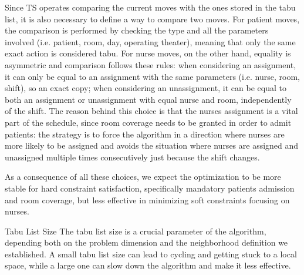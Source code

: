 \begin{section}
\begin{subsection}
     Since TS operates comparing the current moves with the ones stored in the tabu list, it is also necessary to
     define a way to compare two moves. For patient moves, the comparison is performed by checking
     the type and all the parameters involved (i.e. patient, room, day, operating theater),
     meaning that only the same exact action is considered tabu.
     For nurse moves, on the other hand, equality is asymmetric and comparison follows these rules:
     when considering an assignment, it can only be equal to an assignment with the same parameters (i.e. nurse, room, shift),
     so an exact copy;
     when considering an unassignment, it can be equal to both an assignment or unassignment with equal nurse and room,
     independently of the shift.
     The reason behind this choice is that the nurses assignment is a vital part of the schedule,
     since room coverage needs to be granted in order to admit patients:
     the strategy is to force the algorithm in a direction where nurses are more likely to be assigned and avoids the situation
     where nurses are assigned and unassigned multiple times consecutively just because the shift changes.

     As a consequence of all these choices, we expect the optimization to be more stable for hard constraint satisfaction, specifically mandatory patients admission
     and room coverage, but less effective in minimizing soft constraints focusing on nurses.


 \end{subsection}

 \begin{subsection}
     {Tabu List Size}
     The tabu list size is a crucial parameter of the algorithm, depending
     both on the problem dimension and the neighborhood definition we established.
     A small tabu list size can lead to cycling and getting stuck to a local space, while a large one can
     slow down the algorithm and make it less effective.


\end{subsection}
\end{section}
